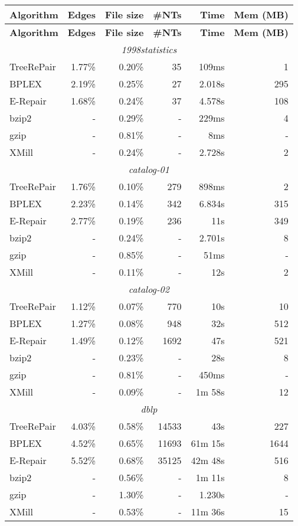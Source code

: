 \documentclass[12pt]{llncs}
\begin{document}
\begin{longtable}{lrrrrr}
			\toprule
\textbf{Algorithm}&\textbf{Edges}&\textbf{File size}&\textbf{\#NTs}&\textbf{Time}&\textbf{Mem (MB)}\\\midrule
\endhead
			\toprule
\textbf{Algorithm}&\textbf{Edges}&\textbf{File size}&\textbf{\#NTs}&\textbf{Time}&\textbf{Mem (MB)}\\
\endfirsthead
			\midrule\multicolumn{6}{c}{\emph{1998statistics}}\\*
			TreeRePair&1.77\%&0.20\%&35&109ms&1\\*
			BPLEX&2.19\%&0.25\%&27&2.018s&295\\*
			E-Repair&1.68\%&0.24\%&37&4.578s&108\\*
			bzip2&-&0.29\%&-&229ms&4\\*
			gzip&-&0.81\%&-&8ms&-\\*
			XMill&-&0.24\%&-&2.728s&2\\
			\midrule\multicolumn{6}{c}{\emph{catalog-01}}\\*
			TreeRePair&1.76\%&0.10\%&279&898ms&2\\*
			BPLEX&2.23\%&0.14\%&342&6.834s&315\\*
			E-Repair&2.77\%&0.19\%&236&11s&349\\*
			bzip2&-&0.24\%&-&2.701s&8\\*
			gzip&-&0.85\%&-&51ms&-\\*
			XMill&-&0.11\%&-&12s&2\\
			\midrule\multicolumn{6}{c}{\emph{catalog-02}}\\*
			TreeRePair&1.12\%&0.07\%&770&10s&10\\*
			BPLEX&1.27\%&0.08\%&948&32s&512\\*
			E-Repair&1.49\%&0.12\%&1692&47s&521\\*
			bzip2&-&0.23\%&-&28s&8\\*
			gzip&-&0.81\%&-&450ms&-\\*
			XMill&-&0.09\%&-&1m 58s&12\\
			\midrule\multicolumn{6}{c}{\emph{dblp}}\\*
			TreeRePair&4.03\%&0.58\%&14533&43s&227\\*
			BPLEX&4.52\%&0.65\%&11693&61m 15s&1644\\*
			E-Repair&5.52\%&0.68\%&35125&42m 48s&516\\*
			bzip2&-&0.56\%&-&1m 11s&8\\*
			gzip&-&1.30\%&-&1.230s&-\\*
			XMill&-&0.53\%&-&11m 36s&15\\

\end{longtable}
\end{document}
